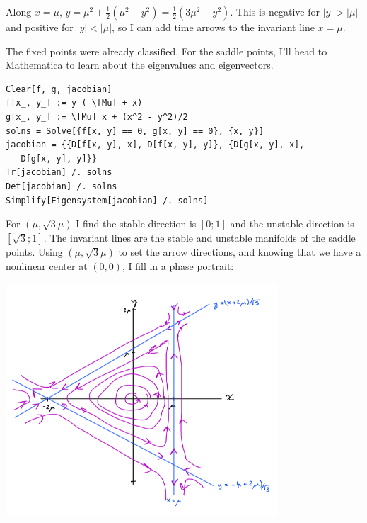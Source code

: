 \documentclass[12pt,letterpaper,answers]{exam}
\begin{document}
\begin{questions}
\begin{parts}
\begin{solution}
Along $x = \mu$, $\dot y = \mu^2 + \frac{1}{2}(\mu^2 - y^2) = \frac{1}{2}(3\mu^2 - y^2)$.  This is negative for $\vert y\vert > \vert \mu \vert$ and positive for $\vert y\vert < \vert \mu \vert$, so I can add time arrows to the invariant line $ x= \mu$.

The fixed points were already classified.  For the saddle points, I'll head to Mathematica to 
learn about the eigenvalues and eigenvectors.  

\begin{verbatim}
Clear[f, g, jacobian]
f[x_, y_] := y (-\[Mu] + x)
g[x_, y_] := \[Mu] x + (x^2 - y^2)/2
solns = Solve[{f[x, y] == 0, g[x, y] == 0}, {x, y}]
jacobian = {{D[f[x, y], x], D[f[x, y], y]}, {D[g[x, y], x], 
   D[g[x, y], y]}}
Tr[jacobian] /. solns
Det[jacobian] /. solns
Simplify[Eigensystem[jacobian] /. solns]
\end{verbatim}


For $(\mu, \sqrt{3}\mu)$ I find the stable direction is $[0; 1]$ and the unstable direction is $[\sqrt{3}; 1]$.  The invariant lines are the stable and unstable manifolds of the saddle points.  Using $(\mu, \sqrt{3}\mu)$ to set the arrow directions, and knowing that we have a nonlinear center at $(0,0)$, I fill in a phase portrait:

\includegraphics[width=4in]{img/Pset05q1e.png}




\end{solution}
\end{parts}
\end{questions}
\end{document}

